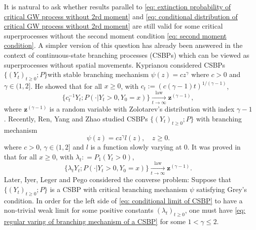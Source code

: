 \documentclass[12pt, a4paper]{amsart}
\theoremstyle{definition}
\numberwithin{equation}{section}
\begin{document}
	It is natural to ask whether results parallel to \eqref{eq: extinction probability of critical GW process without 2rd moment} and \eqref{eq: conditional distribution of critical GW process without 2rd moment} are still valid for some critical superprocesses without the second moment condition \eqref{eq: second moment condition}.
	A simpler version of this question has already been answered in the context of continuous-state branching processes
	(CSBPs)
	which can be viewed as superprocesses without spatial movements.
	Kyprianou \cite{Kyprianou2008Continuous} considered CSBPs $\{(Y_t)_{t\geq 0}; P\}$with stable branching mechanism $\psi(z) =c z^\gamma$ where $c > 0$ and $\gamma \in (1,2]$. 
	He showed that for all $x\geq 0$, with $c_t := (c(\gamma - 1)t)^{1/(\gamma - 1)}$,
\begin{equation} \label{eq: conditional limit of CSBP with stable branching}
	\{c_t^{-1}Y_t; P( \cdot |Y_t > 0,Y_0 = x)\}
	\xrightarrow[t\to \infty]{\operatorname{law}} \mathbf z^{(\gamma - 1)},
\end{equation}
    where $\mathbf z^{(\gamma - 1)}$ is a random variable with Zolotarev's distribution with index $\gamma - 1$.
	Recently, Ren, Yang and Zhao \cite{RenYangZhao2014Conditional} studied
	CSBPs $\{(Y_t)_{t\ge 0}; P\}$ with branching mechanism
\begin{equation}\label{eq: regular varing of branching mechanism of a CSBP}
	\psi(z)
	= c z^\gamma l(z),
	\quad z\geq 0.
\end{equation}
	where $c > 0$, $\gamma \in (1,2]$ and $l$ is a function slowly varying  at $0$.
	It was proved in  \cite{RenYangZhao2014Conditional} that for all $x\geq 0$, with $\lambda_t: = P_1(Y_t > 0)$,
\begin{equation}\label{eq: conditional limit of CSBP}
	\{ \lambda_t Y_t ; P(\cdot | Y_t > 0, Y_0 = x)\}
	\xrightarrow[t\to \infty]{\operatorname{law}} \mathbf z^{(\gamma - 1)}.
\end{equation}
	Later, Iyer, Leger and Pego \cite{IyerLegerPego2015Limit} considered the converse problem: 
	Suppose that $\{(Y_t)_{t\geq 0}; P\}$ is a CSBP with critical branching mechanism $\psi$ satisfying Grey's condition.
	In order for the left side of \eqref{eq: conditional limit of CSBP} to have a non-trivial weak limit for some positive constants $(\lambda_t)_{t\geq 0}$, one must have \eqref{eq: regular varing of branching mechanism of a CSBP} for some $1< \gamma \leq 2$.
	
\end{document}
